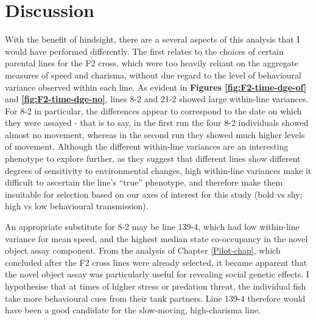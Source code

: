 \documentclass[
]{book}
\begin{document}
\hypertarget{discussion-1}{%
\section{Discussion}\label{discussion-1}}

With the benefit of hindsight, there are a several aspects of this analysis that I would have performed differently. The first relates to the choices of certain parental lines for the F2 cross, which were too heavily reliant on the aggregate measures of speed and charisma, without due regard to the level of behavioural variance observed within each line. As evident in \textbf{Figures \ref{fig:F2-time-dge-of}} and \textbf{\ref{fig:F2-time-dge-no}}, lines \textcolor{8-2_FF699C}{8-2} and \textcolor{21-2_49B500}{21-2} showed large within-line variances. For \textcolor{8-2_FF699C}{8-2} in particular, the differences appear to correspond to the date on which they were assayed - that is to say, in the first run the four \textcolor{8-2_FF699C}{8-2} individuals showed almost no movement, whereas in the second run they showed much higher levels of movement. Although the different within-line variances are an interesting phenotype to explore further, as they suggest that different lines show different degrees of sensitivity to environmental changes, high within-line variances make it difficult to ascertain the line's ``true'' phenotype, and therefore make them insuitable for selection based on our axes of interest for this study (bold vs shy; high vs low behavioural transmission).

An appropriate substitute for \textcolor{8-2_FF699C}{8-2} may be line \textcolor{139-4_FF61CC}{139-4}, which had low within-line variance for mean speed, and the highest median state co-occupancy in the novel object assay component. From the analysis of Chapter \ref{Pilot-chap}, which concluded after the F2 cross lines were already selected, it became apparent that the novel object assay was particularly useful for revealing social genetic effects. I hypothesise that at times of higher stress or predation threat, the individual fish take more behavioural cues from their tank partners. Line \textcolor{139-4_FF61CC}{139-4} therefore would have been a good candidate for the slow-moving, high-charisma line.
\end{document}
